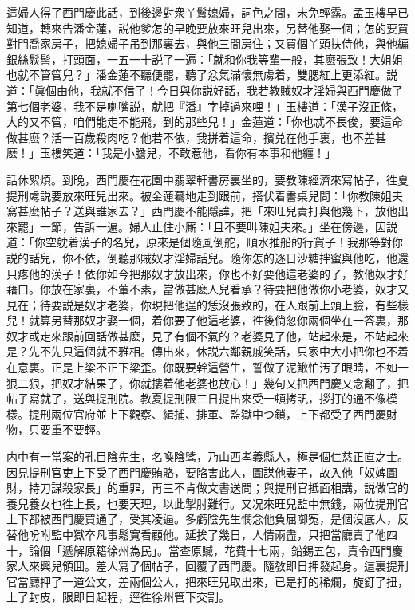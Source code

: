 這婦人得了西門慶此話，到後邊對衆丫鬟媳婦，詞色之間，未免輕露。孟玉樓早已知道，轉來告潘金蓮，説他爹怎的早晚要放來旺兒出來，另替他娶一個；怎的要買對門喬家房子，把媳婦子吊到那裏去，與他三間房住；又買個丫頭扶侍他，與他編銀絲䯼髻，打頭面，一五一十説了一遍：「就和你我等輩一般，其麽張致！大姐姐也就不管管兒？」潘金蓮不聽便罷，聽了忿氣滿懷無䖏着，雙腮紅上更添紅。説道：「眞個由他，我就不信了！今日與你説好話，我若教賊奴才淫婦與西門慶做了第七個老婆，我不是喇嘴説，就把『潘』字掉過來哩！」玉樓道：「漢子沒正條，大的又不管，咱們能走不能飛，到的那些兒！」金蓮道：「你也忒不長俊，要這命做甚麽？活一百歲殺肉吃？他若不依，我拼着這命，擯兑在他手裏，也不差甚麽！」玉樓笑道：「我是小膽兒，不敢惹他，看你有本事和他纏！」

話休絮煩。到晚，西門慶在花園中翡翠軒書房裏坐的，要教陳經濟來寫帖子，徃夏提刑䖏説要放來旺兒出來。被金蓮驀地走到跟前，搭伏着書桌兒問：「你教陳姐夫寫甚麽帖子？送與誰家去？」西門慶不能隱諱，把「來旺兒責打與他幾下，放他出來罷」一節，告訴一遍。婦人止住小廝：「且不要叫陳姐夫來。」坐在傍邊，因説道：「你空躭着漢子的名兒，原來是個隨風倒舵，順水推船的行貨子！我那等對你説的話兒，你不依，倒聽那賊奴才淫婦話兒。隨你怎的逐日沙糖拌蜜與他吃，他還只疼他的漢子！依你如今把那奴才放出來，你也不好要他這老婆的了，教他奴才好藉口。你放在家裏，不葷不素，當做甚麽人兒看承？待要把他做你小老婆，奴才又見在；待要説是奴才老婆，你現把他逞的恁沒張致的，在人跟前上頭上臉，有些樣兒！就算另替那奴才娶一個，着你要了他這老婆，徃後倘忽你兩個坐在一答裏，那奴才或走來跟前回話做甚麽，見了有個不氣的？老婆見了他，站起來是，不站起來是？先不先只這個就不雅相。傳出來，休説六鄰親戚笑話，只家中大小把你也不着在意裏。正是上梁不正下梁歪。你既要幹這營生，誓做了泥鰍怕汚了眼睛，不如一狠二狠，把奴才結果了，你就摟着他老婆也放心！」幾句又把西門慶又念翻了，把帖子寫就了，送與提刑院。教夏提刑限三日提出來受一頓拷訊，拶打的通不像模樣。提刑兩位官府並上下觀察、緝捕、排軍、監獄中つ鎖，上下都受了西門慶財物，只要重不要輕。

内中有一當案的孔目陰先生，名喚陰骘，乃山西孝義縣人，極是個仁慈正直之士。因見提刑官吏上下受了西門慶賄賂，要陷害此人，圖謀他妻子，故入他「奴婢圖財，持刀謀殺家長」的重罪，再三不肯做文書送問；與提刑官抵面相講，説做官的養兒養女也徃上長，也要天理，以此掣肘難行。又况來旺兒監中無錢，兩位提刑官上下都被西門慶買通了，受其凌逼。多虧陰先生憫念他負屈啣寃，是個沒底人，反替他吩咐監中獄卒凡事鬆寬看顧他。延挨了幾日，人情兩盡，只把當廳責了他四十，論個「遞解原籍徐州為民」。當查原贓，花費十七兩，鉛錫五包，責令西門慶家人來興兒領囬。差人寫了個帖子，回覆了西門慶。隨敎即日押發起身。這裏提刑官當廳押了一道公文，差兩個公人，把來旺兒取出來，已是打的稀爛，旋釘了扭，上了封皮，限即日起程，逕徃徐州管下交割。

